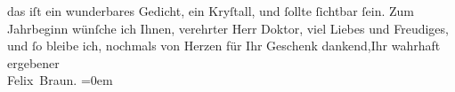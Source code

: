 \begin{ledgroupsized}[t]{13cm}
           das iſt ein wunderbares Gedicht, ein Kryſtall, und ſollte ſichtbar ſein.\pend
           \pstart
           Zum Jahrbeginn wünſche ich Ihnen, verehrter Herr Doktor, viel Liebes und
               Freudiges, und ſo bleibe {\pb}ich, nochmals
               von Herzen für Ihr Geschenk dankend,\hspace*{1.5em}Ihr wahrhaft ergebener{\\[\baselineskip]}\spacefill\mbox{Felix Braun.}\pend
           \leftskip=0em{}\endnumbering{}\end{ledgroupsized}  \newcommand{\dateiname}{L02494}\newcommand{\titel}{Felix Braun an Arthur Schnitzler, 25. 12. 1927}\newcommand{\editorInnen}{Martin Anton Müller und Gerd-Hermann Susen}
      